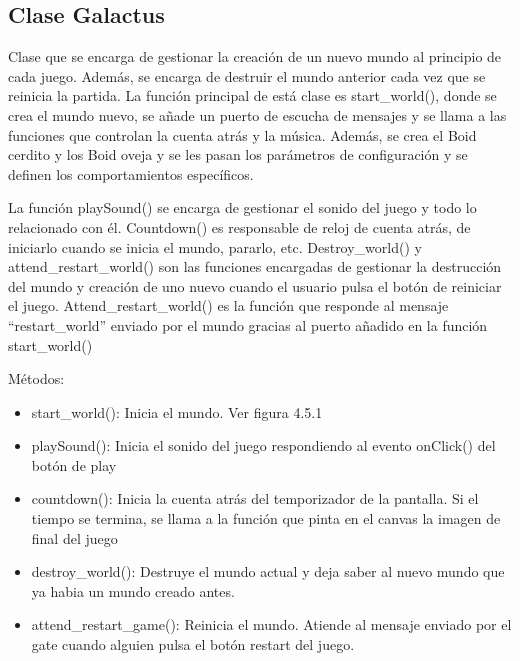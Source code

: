 \subsection{Clase Galactus}
\label{subsection:galactus}

Clase que se encarga de gestionar la creación de un nuevo mundo al principio de cada juego. Además, se encarga de destruir el mundo 
anterior cada vez que se reinicia la partida. La función principal de está clase es start\_world(), donde se crea el mundo nuevo, se añade 
un puerto de escucha de mensajes y se llama a las funciones que controlan la cuenta atrás y la música. Además, se crea el Boid cerdito y 
los Boid oveja y se les pasan los parámetros de configuración y se definen los comportamientos específicos.

La función playSound() se encarga de gestionar el sonido del juego y todo lo relacionado con él. Countdown() es responsable de reloj de 
cuenta atrás, de iniciarlo cuando se inicia el mundo, pararlo, etc. Destroy\_world() y attend\_restart\_world() son las funciones encargadas 
de gestionar la destrucción del mundo y creación de uno nuevo cuando el usuario pulsa el botón de reiniciar el juego. 
Attend\_restart\_world() es la función que responde al mensaje “restart\_world” enviado por el mundo gracias al puerto añadido en la 
función start\_world()

Métodos:
\begin{itemize}
 \item start\_world():
Inicia el mundo. Ver figura 4.5.1

 \item playSound():
Inicia el sonido del juego respondiendo al evento onClick() del botón de play

 \item countdown():
Inicia la cuenta atrás del temporizador de la pantalla. Si el tiempo se termina, se llama a la función que pinta en el canvas la imagen de final del juego

 \item destroy\_world():
Destruye el mundo actual y deja saber al nuevo mundo que ya habia un mundo creado antes.

 \item attend\_restart\_game():
Reinicia el mundo. Atiende al mensaje enviado por el gate cuando alguien pulsa el botón restart del juego.
\end{itemize}


